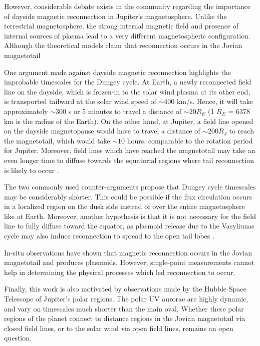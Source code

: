 However, considerable debate exists in the community regarding the importance of dayside magnetic reconnection in Jupiter's magnetosphere. Unlike the terrestrial magnetosphere, the strong internal magnetic field and presence of internal sources of plasma lead to a very different magnetospheric configuration. Although the theoretical models claim that reconnection occurs in the Jovian magnetotail

One argument made against dayside magnetic reconnection highlights the improbable timescales for the Dungey cycle. At Earth, a newly reconnected field line on the dayside, which is frozen-in to the solar wind plasma at its other end, is transported tailward at the solar wind speed of $\sim400$ km/s. Hence, it will take approximately $\sim$300 s or 5 minutes to travel a distance of $\sim20 R_E$ (1 $R_E$ = 6378 km is the radius of the Earth). On the other hand, at Jupiter, a field line opened on the dayside magnetopause would have to travel a distance of $\sim200 R_J$ to reach the magnetotail, which would take  $\sim10$ hours, comparable to the rotation period for Jupiter. Moreover, field lines which have reached the magnetotail may take an even longer time to diffuse towards the equatorial regions where tail reconnection is likely to occur \cite{McComas2007}. 

The two commonly used counter-arguments propose that Dungey cycle timescales may be considerably shorter. This could be possible if the flux circulation occurs in a localized region on the dusk side instead of over the entire magnetosphere like at Earth. Moreover, another hypothesis is that it is not necessary for the field line to fully diffuse toward the equator, as plasmoid release due to the Vasyliunas cycle may also induce reconnection to spread to the open tail lobes \cite{Cowley2008}. 

In-situ observations have shown that magnetic reconnection occurs in the Jovian magnetotail and produces plasmoids. However, single-point measurements cannot help in determining the physical processes which led reconnection to occur. 

Finally, this work is also motivated by observations made by the Hubble Space Telescope of Jupiter's polar regions. The polar UV aurorae are highly dynamic, and vary on timescales much shorter than the main oval. Whether these polar regions of the planet connect to distance regions in the Jovian magnetotail via closed field lines, or to the solar wind via open field lines, remains an open question. 

